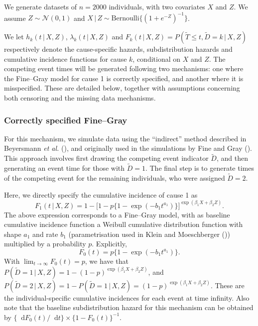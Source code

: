 \documentclass[
  letterpaper,
  paper=240mm:170mm,
  twoside=true,
  open=right,
  fontsize=10pt,
  pagesize=false,
  BCOR=15mm,
  DIV=14,
  headinclude=true,
  footinclude=false,
  headsepline=on]{scrbook}
\newcommand{\given}{\,|\,}
\newcommand\diff{\mathop{}\!\mathrm{d}}
\begin{document}
We generate datasets of \(n = 2000\) individuals, with two covariates
\(X\) and \(Z\). We assume \(Z \sim \mathcal{N}(0,1)\) and
\(X \given Z \sim \text{Bernoulli}\{(1 + e^{-Z})^{-1}\}\).

We let \(h_k(t \given X, Z)\), \(\lambda_k(t \given X, Z)\) and
\(F_k(t \given X, Z) = P(\tilde{T} \leq t, \tilde{D} = k \given X, Z)\)
respectively denote the cause-specific hazards, subdistribution hazards
and cumulative incidence functions for cause \(k\), conditional on \(X\)
and \(Z\). The competing event times will be generated following two
mechanisms: one where the Fine--Gray model for cause 1 is correctly
specified, and another where it is misspecified. These are detailed
below, together with assumptions concerning both censoring and the
missing data mechanisms.

\subsubsection{Correctly specified Fine--Gray}\label{sec-corr-spec-FG}

For this mechanism, we simulate data using the ``indirect'' method
described in Beyersmann \emph{et al.}
(), and
originally used in the simulations by Fine and Gray
(). This approach
involves first drawing the competing event indicator \(\tilde{D}\), and
then generating an event time for those with \(\tilde{D} = 1\). The
final step is to generate times of the competing event for the remaining
individuals, who were assigned \(\tilde{D} = 2\).

Here, we directly specify the cumulative incidence of cause 1 as
\begin{equation*}
    F_1(t \given X, Z) = 1 - \big[1 - p\{1- \exp(-b_1t^{a_1})\}\big]^{\exp(\beta_{1}X + \beta_{2}Z)}.
\end{equation*} The above expression corresponds to a Fine--Gray model,
with as baseline cumulative incidence function a Weibull cumulative
distribution function with shape \(a_1\) and rate \(b_1\)
(parametrisation used in Klein and Moeschberger
()) multiplied
by a probability \(p\). Explicitly, \begin{equation*}
    F_0(t) = p\{1- \exp(-b_1t^{a_1})\}.
\end{equation*} With \(\lim_{t \to \infty}F_0(t) = p\), we have that
\(P(\tilde{D} = 1 \given X,Z) = 1 - (1-p)^{\exp(\beta_{1}X + \beta_{2}Z)}\),
and
\(P(\tilde{D} = 2 \given X, Z) = 1 - P(\tilde{D} = 1 \given X, Z) = (1-p)^{\exp(\beta_{1}X + \beta_{2}Z)}\).
These are the individual-specific cumulative incidences for each event
at time infinity. Also note that the baseline subdistribution hazard for
this mechanism can be obtained by
\(\{\diff F_0(t) / \diff t\} \times \{1 - F_0(t)\}^{-1}\).
\end{document}
